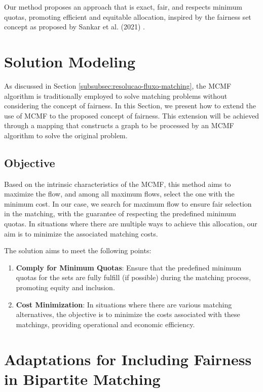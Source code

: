         Our method proposes an approach that is exact, fair, and respects minimum quotas, promoting efficient and equitable allocation, inspired by the fairness set concept as proposed by Sankar et al. (2021) \cite{sankar2021set}.

        
        \section{Solution Modeling}
        
            As discussed in Section {\ref{subsubsec:resolucao-fluxo-matching}}, the MCMF algorithm is traditionally employed to solve matching problems without considering the concept of fairness. In this Section, we present how to extend the use of MCMF to the proposed concept of fairness. This extension will be achieved through a mapping that constructs a graph to be processed by an MCMF algorithm to solve the original problem.
            
            \subsection{Objective}
            
                Based on the intrinsic characteristics of the MCMF, this method aims to maximize the flow, and among all maximum flows, select the one with the minimum cost.
                In our case, we search for maximum flow to ensure fair selection in the matching, with the guarantee of respecting the predefined minimum quotas. In situations where there are multiple ways to achieve this allocation, our aim is to minimize the associated matching costs.
                
                The solution aims to meet the following points:
                
                \begin{enumerate} \item \textbf{Comply for Minimum Quotas}: Ensure that the predefined minimum quotas for the sets are fully fulfill (if possible) during the matching process, promoting equity and inclusion. \item \textbf{Cost Minimization}: In situations where there are various matching alternatives, the objective is to minimize the costs associated with these matchings, providing operational and economic efficiency. \end{enumerate}
        
        
        \section{Adaptations for Including Fairness in Bipartite Matching}
        
